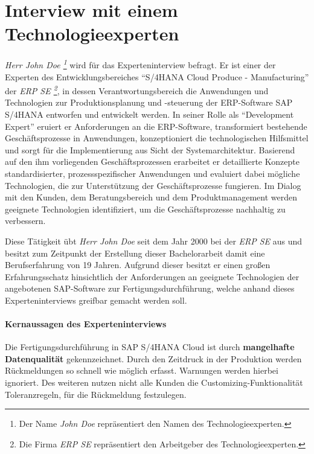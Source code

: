 \tocless\section{Interview mit einem Technologieexperten}\label{ah:interviewDev}

\textit{Herr John Doe \footnote{Der Name \textit{John Doe} repräsentiert den Namen des Technologieexperten.}} wird für das Experteninterview befragt.
 Er ist einer der Experten des Entwicklungsbereiches \enquote{S/4HANA Cloud Produce - Manufacturing} der \textit{ERP SE \footnote{Die Firma \textit{ERP SE} repräsentiert den Arbeitgeber des Technologieexperten.}}, in dessen Verantwortungsbereich die Anwendungen und Technologien zur Produktionsplanung und -steuerung der \ac{ERP}-Software SAP S/4HANA entworfen und entwickelt werden.
 In seiner Rolle als \enquote{Development Expert} eruiert er Anforderungen an die \ac{ERP}-Software, transformiert bestehende Geschäftsprozesse in Anwendungen, konzeptioniert die technologischen Hilfsmittel und sorgt für die Implementierung aus Sicht der Systemarchitektur. Basierend auf den ihm vorliegenden Geschäftsprozessen erarbeitet er detaillierte Konzepte standardisierter, prozessspezifischer Anwendungen und evaluiert dabei mögliche Technologien, die zur Unterstützung der Geschäftsprozesse fungieren. Im Dialog mit den Kunden, dem Beratungsbereich und dem Produktmanagement werden geeignete Technologien identifiziert, um die Geschäftsprozesse nachhaltig zu verbessern. 
 
Diese Tätigkeit übt \textit{Herr John Doe} seit dem Jahr 2000 bei der \textit{ERP SE} aus und besitzt zum Zeitpunkt der Erstellung dieser Bachelorarbeit damit eine Berufserfahrung von 19 Jahren. Aufgrund dieser besitzt er einen großen Erfahrungsschatz hinsichtlich der Anforderungen an geeignete Technologien der angebotenen SAP-Software zur Fertigungsdurchführung, welche anhand dieses Experteninterviews greifbar gemacht werden soll.

\paragraph{Kernaussagen des Experteninterviews}

\begin{definitionForm}[KA-T-1]
Die Fertigungsdurchführung in SAP S/4HANA Cloud ist durch \textbf{mangelhafte Datenqualität} gekennzeichnet. Durch den Zeitdruck in der Produktion werden Rückmeldungen so schnell wie möglich erfasst. Warnungen werden hierbei ignoriert. Des weiteren nutzen nicht alle Kunden die Customizing-Funktionalität Toleranzregeln, für die Rückmeldung festzulegen.
\end{definitionForm}

